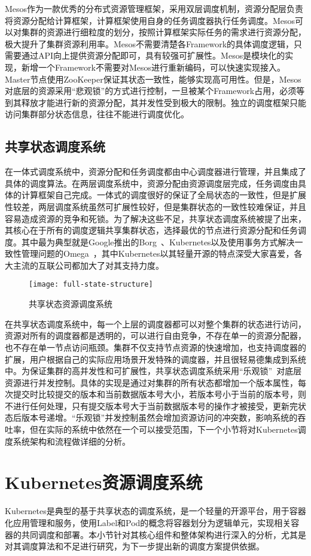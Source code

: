 Mesos作为一款优秀的分布式资源管理框架，采用双层调度机制，资源分配层负责将资源分配给计算框架，计算框架使用自身的任务调度器执行任务调度。Mesos可以对集群的资源进行细粒度的划分，按照计算框架实际任务的需求进行资源分配，极大提升了集群资源利用率。Mesos不需要清楚各Framework的具体调度逻辑，只需要通过API向上提供资源分配即可，具有较强可扩展性。Mesos是模块化的实现，新增一个Framework不需要对Mesos进行重新编码，可以快速实现接入。Master节点使用ZooKeeper保证其状态一致性，能够实现高可用性。但是，Mesos对底层的资源采用“悲观锁”的方式进行控制，一旦被某个Framework占用，必须等到其释放才能进行新的资源分配，其并发性受到极大的限制。独立的调度框架只能访问集群部分状态信息，往往不能进行调度优化。
\subsection{共享状态调度系统}
在一体式调度系统中，资源分配和任务调度都由中心调度器进行管理，并且集成了具体的调度算法。在两层调度系统中，资源分配由资源调度层完成，任务调度由具体的计算框架自己完成。一体式的调度很好的保证了全局状态的一致性，但是扩展性较差，两层调度系统虽然可扩展性较好，但是集群状态的一致性较难保证，并且容易造成资源的竞争和死锁。为了解决这些不足，共享状态调度系统被提了出来，其核心在于所有的调度逻辑共享集群状态，选择最优的节点进行资源分配和任务调度。其中最为典型就是Google推出的Borg~\cite{KUB2015}、Kubernetes以及使用事务方式解决一致性管理问题的Omega~\cite{Burns2016Borg}，其中Kubernetes以其轻量开源的特点深受大家喜爱，各大主流的互联公司都加大了对其支持力度。

\begin{figure}[H] %
	\centering
	\texttt{[image: full-state-structure]}
	\caption{共享状态资源调度系统}
\end{figure}
在共享状态调度系统中，每一个上层的调度器都可以对整个集群的状态进行访问，资源对所有的调度器都是透明的，可以进行自由竞争，不存在单一的资源分配器，也不存在单一节点访问瓶颈。集群不仅支持节点资源的快速增加，也支持调度器的扩展，用户根据自己的实际应用场景开发特殊的调度器，并且很轻易德集成到系统中。为保证集群的高并发性和可扩展性，共享状态调度系统采用“乐观锁”~\cite{Halici1991An}对底层资源进行并发控制。具体的实现是通过对集群的所有状态都增加一个版本属性，每次提交时比较提交的版本和当前数据版本号大小，若版本号小于当前的版本号，则不进行任何处理，只有提交版本号大于当前数据版本号的操作才被接受，更新完状态后版本号递增。“乐观锁”并发控制虽然会增加资源访问的冲突数，影响系统的吞吐率，但在实际的系统中依然在一个可以接受范围，下一个小节将对Kubernetes调度系统架构和流程做详细的分析。

\section{Kubernetes资源调度系统}
Kubernetes是典型的基于共享状态的调度系统，是一个轻量的开源平台，用于容器化应用管理和服务，使用Label和Pod的概念将容器划分为逻辑单元，实现相关容器的共同调度和部署。本小节针对其核心组件和整体架构进行深入的分析，尤其是对其调度算法和不足进行研究，为下一步提出新的调度方案提供依据。
